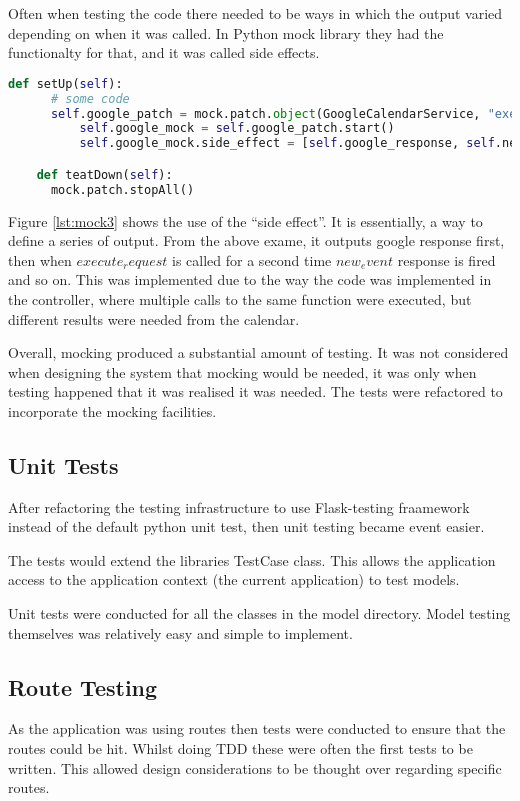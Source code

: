 Often when testing the code there needed to be ways in which the output varied depending on when it was called. In Python mock library they had the functionalty for that, and it was called side effects.

\begin{lstlisting}[language=python, label={lst:mock3}, breaklines, columns=fullflexible, keywordstyle=\color{blue}]
    def setUp(self):
      # some code
      self.google_patch = mock.patch.object(GoogleCalendarService, "execute_request")
          self.google_mock = self.google_patch.start()
          self.google_mock.side_effect = [self.google_response, self.new_event, self.google_response, self.updated_response]

    def teatDown(self):
      mock.patch.stopAll()
\end{lstlisting}

Figure \ref{lst:mock3} shows the use of the ``side effect''. It is essentially, a way to define a series of output. From the above exame, it outputs google response first, then when $execute_request$ is called for a second time $new_event$ response is fired and so on. This was implemented due to the way the code was implemented in the controller, where multiple calls to the same function were executed, but different results were needed from the calendar.

Overall, mocking produced a substantial amount of testing. It was not considered when designing the system that mocking would be needed, it was only when testing happened that it was realised it was needed. The tests were refactored to incorporate the mocking facilities.

\subsection{Unit Tests}
After refactoring the testing infrastructure to use Flask-testing fraamework instead of the default python unit test, then unit testing became event easier.

The tests would extend the libraries TestCase class. This allows the application access to the application context (the current application) to test models.

Unit tests were conducted for all the classes in the model directory. Model testing themselves was relatively easy and simple to implement.

\subsection{Route Testing}
As the application was using routes then tests were conducted to ensure that the routes could be hit. Whilst doing TDD these were often the first tests to be written. This allowed design considerations to be thought over regarding specific routes.

